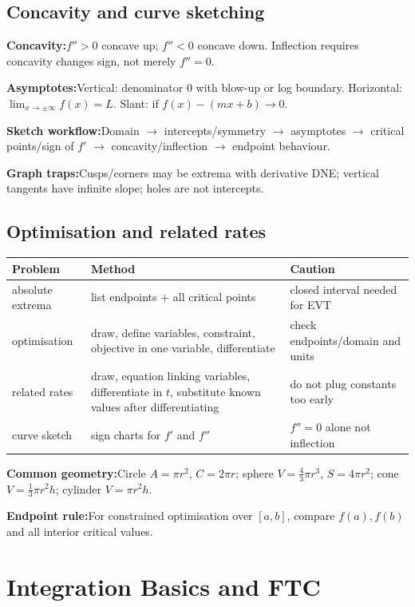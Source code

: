 \documentclass[10pt]{article}
\newenvironment{cheatitems}{\par\vspace{-2pt}}{\par\vspace{-2pt}}
\newcommand{\cheatrow}[2]{%
  \par\noindent\textbf{#1:}\nobreak\hspace{0.25em}#2\par
}
\begin{document}
\begin{multicols}{3}
\subsection*{Concavity and curve sketching}
\begin{cheatitems}
\cheatrow{Concavity}{$f''>0$ concave up; $f''<0$ concave down. Inflection requires concavity changes sign, not merely $f''=0$.}
\cheatrow{Asymptotes}{Vertical: denominator $0$ with blow-up or log boundary. Horizontal: $\lim_{x\to\pm\infty}f(x)=L$. Slant: if $f(x)-(mx+b)\to0$.}
\cheatrow{Sketch workflow}{Domain $\to$ intercepts/symmetry $\to$ asymptotes $\to$ critical points/sign of $f'$ $\to$ concavity/inflection $\to$ endpoint behaviour.}
\cheatrow{Graph traps}{Cusps/corners may be extrema with derivative DNE; vertical tangents have infinite slope; holes are not intercepts.}
\end{cheatitems}

\subsection*{Optimisation and related rates}
\begin{tabular}{@{}L{0.26\columnwidth}L{0.39\columnwidth}L{0.29\columnwidth}@{}}
\toprule
\textbf{Problem} & \textbf{Method} & \textbf{Caution}\tabularnewline
\midrule
absolute extrema & list endpoints + all critical points & closed interval needed for EVT\tabularnewline
optimisation & draw, define variables, constraint, objective in one variable, differentiate & check endpoints/domain and units\tabularnewline
related rates & draw, equation linking variables, differentiate in $t$, substitute known values after differentiating & do not plug constants too early\tabularnewline
curve sketch & sign charts for $f'$ and $f''$ & $f''=0$ alone not inflection\tabularnewline
\bottomrule
\end{tabular}

\begin{cheatitems}
\vspace{2pt}
\cheatrow{Common geometry}{Circle $A=\pi r^2$, $C=2\pi r$; sphere $V=\frac43\pi r^3$, $S=4\pi r^2$; cone $V=\frac13\pi r^2h$; cylinder $V=\pi r^2h$.}
\cheatrow{Endpoint rule}{For constrained optimisation over $[a,b]$, compare $f(a),f(b)$ and all interior critical values.}
\end{cheatitems}

\section*{Integration Basics and FTC}


\end{multicols}
\end{document}
